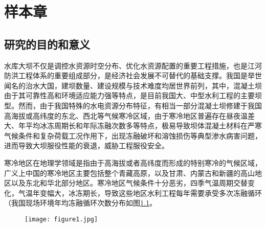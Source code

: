 \chapter{样本章}
\label{chap:sample}
\section{研究的目的和意义}
\label{sec:aim}

水库大坝不仅是调控水资源时空分布、优化水资源配置的重要工程措施，也是江河防洪工程体系的重要组成部分，是经济社会发展不可替代的基础支撑\cite{胡四一2008确保水库大坝安全意义重大任务艰巨}。我国是举世闻名的治水大国，建坝数量、建设规模与技术难度均居世界前列，其中，混凝土坝由于其可靠性高和环境适应能力强等特点，是目前我国大、中型水利工程的主要坝型。然而，由于我国特殊的水电资源分布特征，有相当一部分混凝土坝修建于我国高海拔或高纬度的东北、西北等气候寒冷区域，由于寒冷地区普遍存在昼夜温差大、年平均冰冻周期长和年际冻融次数多等特点，极易导致坝体混凝土材料在严寒气候条件和复杂荷载工况作用下，出现冻融破坏和溶蚀损伤等典型渗水病害问题，进而导致大坝服役性能的衰退，威胁工程服役安全。\par
寒冷地区在地理学领域是指由于高海拔或者高纬度而形成的特别寒冷的气候区域，广义上中国的寒冷地区主要包括整个青藏高原，以及甘肃、内蒙古和新疆的高山地区以及东北和华北部分地区。寒冷地区气候条件十分恶劣，四季气温周期交替变化，气温年变幅大，冰冻期长，导致这些地区水利工程每年需要承受多次冻融循环（我国现场环境年均冻融循环次数分布如图\ref{fig:map}\cite{武海荣2012混凝土冻融环境区划与抗冻性寿命预测}。

\begin{figure}[H]
	\centering
	\texttt{[image: figure1.jpg]}
	\label{fig:map}
\end{figure}
